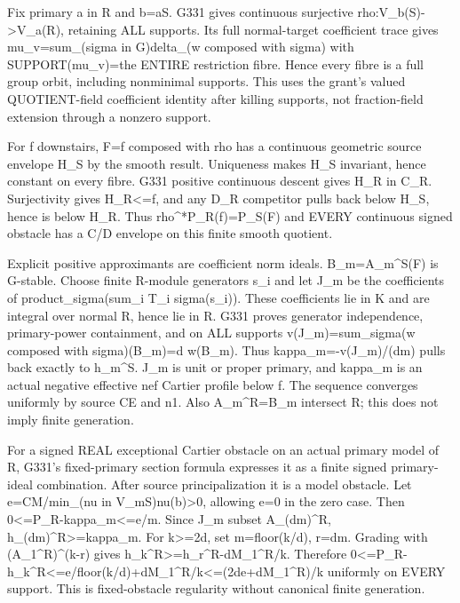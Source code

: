 Fix primary a in R and b=aS. G331 gives continuous surjective rho:V\_b(S)-\textgreater{}V\_a(R), retaining ALL supports. Its full normal-target coefficient trace gives mu\_v=sum\_(sigma in G)delta\_(w composed with sigma) with SUPPORT(mu\_v)=the ENTIRE restriction fibre. Hence every fibre is a full group orbit, including nonminimal supports. This uses the grant's valued QUOTIENT-field coefficient identity after killing supports, not fraction-field extension through a nonzero support.

For f downstairs, F=f composed with rho has a continuous geometric source envelope H\_S by the smooth result. Uniqueness makes H\_S invariant, hence constant on every fibre. G331 positive continuous descent gives H\_R in C\_R. Surjectivity gives H\_R\textless{}=f, and any D\_R competitor pulls back below H\_S, hence is below H\_R. Thus rho\textasciicircum{}*P\_R(f)=P\_S(F) and EVERY continuous signed obstacle has a C/D envelope on this finite smooth quotient.

Explicit positive approximants are coefficient norm ideals. B\_m=A\_m\textasciicircum{}S(F) is G-stable. Choose finite R-module generators s\_i and let J\_m be the coefficients of product\_sigma(sum\_i T\_i sigma(s\_i)). These coefficients lie in K and are integral over normal R, hence lie in R. G331 proves generator independence, primary-power containment, and on ALL supports v(J\_m)=sum\_sigma(w composed with sigma)(B\_m)=d w(B\_m). Thus kappa\_m=-v(J\_m)/(dm) pulls back exactly to h\_m\textasciicircum{}S. J\_m is unit or proper primary, and kappa\_m is an actual negative effective nef Cartier profile below f. The sequence converges uniformly by source CE and n1. Also A\_m\textasciicircum{}R=B\_m intersect R; this does not imply finite generation.

For a signed REAL exceptional Cartier obstacle on an actual primary model of R, G331's fixed-primary section formula expresses it as a finite signed primary-ideal combination. After source principalization it is a model obstacle. Let e=CM/min\_(nu in V\_mS)nu(b)\textgreater{}0, allowing e=0 in the zero case. Then 0\textless{}=P\_R-kappa\_m\textless{}=e/m. Since J\_m subset A\_(dm)\textasciicircum{}R, h\_(dm)\textasciicircum{}R\textgreater{}=kappa\_m. For k\textgreater{}=2d, set m=floor(k/d), r=dm. Grading with (A\_1\textasciicircum{}R)\textasciicircum{}(k-r) gives h\_k\textasciicircum{}R\textgreater{}=h\_r\textasciicircum{}R-dM\_1\textasciicircum{}R/k. Therefore 0\textless{}=P\_R-h\_k\textasciicircum{}R\textless{}=e/floor(k/d)+dM\_1\textasciicircum{}R/k\textless{}=(2de+dM\_1\textasciicircum{}R)/k uniformly on EVERY support. This is fixed-obstacle regularity without canonical finite generation.

